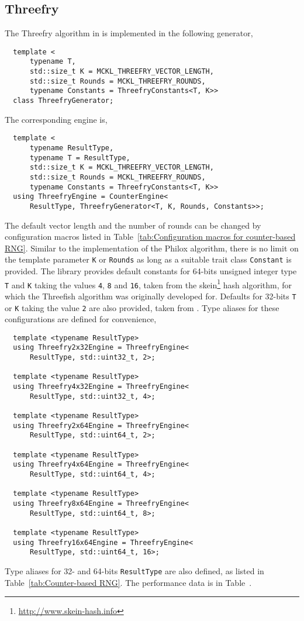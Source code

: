 \subsection{Threefry}
\label{sub:Threefry}

The Threefry algorithm in \textcite{Salmon:2011um} is implemented in the
following generator,
\begin{Verbatim}
  template <
      typename T,
      std::size_t K = MCKL_THREEFRY_VECTOR_LENGTH,
      std::size_t Rounds = MCKL_THREEFRY_ROUNDS,
      typename Constants = ThreefryConstants<T, K>>
  class ThreefryGenerator;
\end{Verbatim}
The corresponding \rng engine is,
\begin{Verbatim}
  template <
      typename ResultType,
      typename T = ResultType,
      std::size_t K = MCKL_THREEFRY_VECTOR_LENGTH,
      std::size_t Rounds = MCKL_THREEFRY_ROUNDS,
      typename Constants = ThreefryConstants<T, K>>
  using ThreefryEngine = CounterEngine<
      ResultType, ThreefryGenerator<T, K, Rounds, Constants>>;
\end{Verbatim}
The default vector length and the number of rounds can be changed by
configuration macros listed in Table~\ref{tab:Configuration macros for
  counter-based RNG}. Similar to the implementation of the Philox algorithm,
there is no limit on the template parameter \verb|K| or \verb|Rounds| as long
as a suitable trait class \verb|Constant| is provided. The library provides
default constants for 64-bits unsigned integer type \verb|T| and \verb|K|
taking the values \verb|4|, \verb|8| and \verb|16|, taken from the
skein\footnote{\url{http://www.skein-hash.info}} hash algorithm, for which the
Threefish algorithm was originally developed for. Defaults for 32-bits \verb|T|
or \verb|K| taking the value \verb|2| are also provided, taken from
\textcite{Salmon:2011um}. Type aliases for these configurations are defined for
convenience,
\begin{Verbatim}
  template <typename ResultType>
  using Threefry2x32Engine = ThreefryEngine<
      ResultType, std::uint32_t, 2>;

  template <typename ResultType>
  using Threefry4x32Engine = ThreefryEngine<
      ResultType, std::uint32_t, 4>;

  template <typename ResultType>
  using Threefry2x64Engine = ThreefryEngine<
      ResultType, std::uint64_t, 2>;

  template <typename ResultType>
  using Threefry4x64Engine = ThreefryEngine<
      ResultType, std::uint64_t, 4>;

  template <typename ResultType>
  using Threefry8x64Engine = ThreefryEngine<
      ResultType, std::uint64_t, 8>;

  template <typename ResultType>
  using Threefry16x64Engine = ThreefryEngine<
      ResultType, std::uint64_t, 16>;
\end{Verbatim}
Type aliases for 32- and 64-bits \verb|ResultType| are also defined, as listed
in Table~\ref{tab:Counter-based RNG}. The performance data is in
Table~.

